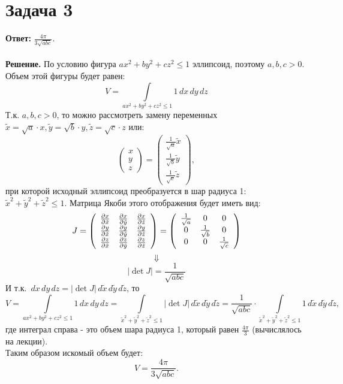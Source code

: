 \documentclass{article}
\begin{document}
\section*{Задача 3}
{\bf Ответ: } $\frac{4\pi}{3\sqrt{abc}}$.
\\
\\
{\bf Решение.} По условию фигура $ax^2+by^2+cz^2 \leq 1$ эллипсоид, поэтому $a,b,c > 0$. Объем этой фигуры будет равен:
$$V=\int\limits_{ax^2+by^2+cz^2 \leq 1} 1 \,dx\,dy\,dz$$
Т.к. $a,b,c > 0$, то можно рассмотреть замену переменных $\tilde x = \sqrt{a}\cdot x, \tilde y = \sqrt{b}\cdot y, \tilde z = \sqrt{c}\cdot z$ или: 
$$\left(\begin{array}{ccc}x\\y\\z\end{array}\right) = \left(\begin{array}{ccc}\frac{1}{\sqrt{a}}\tilde x\\\frac{1}{\sqrt{b}}\tilde y\\\frac{1}{\sqrt{c}}\tilde z\end{array}\right),$$ 
при которой исходный эллипсоид преобразуется в шар радиуса 1: $\tilde x^2 + \tilde y^2 + \tilde z^2 \leq 1 $. Матрица Якоби этого отображения будет иметь вид:
$$J = \left(\begin{array}{ccc}\pdv{x}{\tilde x}&\pdv{x}{\tilde y}&\pdv{x}{\tilde z}\\\pdv{y}{\tilde x}&\pdv{y}{\tilde y}&\pdv{y}{\tilde z}\\\pdv{z}{\tilde x}&\pdv{z}{\tilde y}&\pdv{z}{\tilde z}\end{array}\right)=\left(\begin{array}{ccc}\frac{1}{\sqrt{a}}&0&0\\0&\frac{1}{\sqrt{b}}&0\\0&0&\frac{1}{\sqrt{c}}\end{array}\right)$$
$$\Downarrow$$
$$|\det J|=\frac{1}{\sqrt{abc}}$$
И т.к. $\,dx\,dy\,dz=|\det J| \,d\tilde x\,d\tilde y\,d\tilde z$, то
$$V=\int\limits_{ax^2+by^2+cz^2 \leq 1} 1 \,dx\,dy\,dz=\int\limits_{\tilde x^2 + \tilde y^2 + \tilde z^2 \leq 1 } |\det J| \,d\tilde x \,d\tilde y \,d\tilde z = \frac{1}{\sqrt{abc}}\cdot\int\limits_{\tilde x^2 + \tilde y^2 + \tilde z^2 \leq 1} 1 \,d\tilde x\,d\tilde y\,d\tilde z,$$
где интеграл справа - это объем шара радиуса 1, который равен $\frac{4\pi}{3}$ (вычислялось на лекции). 
\\
Таким образом искомый объем будет:
$$V = \frac{4\pi}{3\sqrt{abc}}.$$
\end{document}

